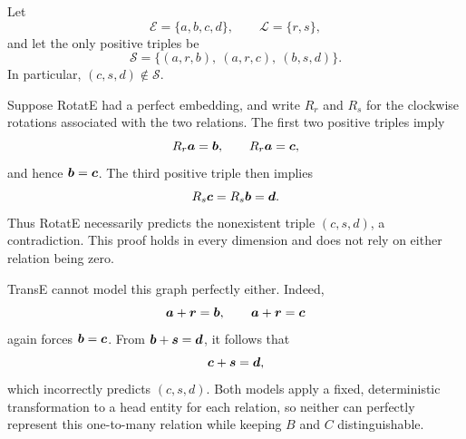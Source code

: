 \begin{solution}
Let
\[
  \mathcal E=\{a,b,c,d\},\qquad
  \mathcal L=\{r,s\},
\]
and let the only positive triples be
\[
  \mathcal S
  =\{(a,r,b),\ (a,r,c),\ (b,s,d)\}.
\]
In particular, \((c,s,d)\notin\mathcal S\).

Suppose RotatE had a perfect embedding, and write \(R_r\) and \(R_s\) for
the clockwise rotations associated with the two relations.  The first two
positive triples imply
\[
  R_r\bm{a}=\bm{b},
  \qquad
  R_r\bm{a}=\bm{c},
\]
and hence \(\bm{b}=\bm{c}\).  The third positive triple then implies
\[
  R_s\bm{c}
  =R_s\bm{b}
  =\bm{d}.
\]
Thus RotatE necessarily predicts the nonexistent triple \((c,s,d)\), a
contradiction.  This proof holds in every dimension and does not rely on
either relation being zero.

TransE cannot model this graph perfectly either.  Indeed,
\[
  \bm{a}+\bm{r}=\bm{b},
  \qquad
  \bm{a}+\bm{r}=\bm{c}
\]
again forces \(\bm{b}=\bm{c}\).  From
\(\bm{b}+\bm{s}=\bm{d}\), it follows that
\[
  \bm{c}+\bm{s}=\bm{d},
\]
which incorrectly predicts \((c,s,d)\).  Both models apply a fixed,
deterministic transformation to a head entity for each relation, so neither
can perfectly represent this one-to-many relation while keeping \(B\) and
\(C\) distinguishable.
\end{solution}

